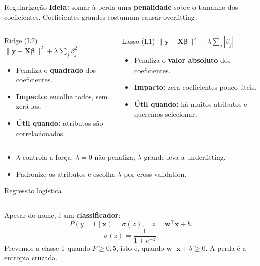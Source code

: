 \documentclass[10pt]{beamer}
\begin{document}
\begin{frame}{Regularização}
\small
\textbf{Ideia:} somar à perda uma \textbf{penalidade} sobre o tamanho dos coeficientes. Coeficientes grandes costumam causar overfitting.
\begin{columns}[T]
\begin{block}{Ridge (L2)}
$\|\mathbf{y}-\mathbf{X}\boldsymbol\beta\|^2+\lambda\sum_j\beta_j^2$
\begin{itemize}
 \item Penaliza o \textbf{quadrado} dos coeficientes.
 \item \textbf{Impacto:} encolhe todos, sem zerá-los.
 \item \textbf{Útil quando:} atributos são correlacionados.
\end{itemize}
\end{block}
\begin{block}{Lasso (L1)}
$\|\mathbf{y}-\mathbf{X}\boldsymbol\beta\|^2+\lambda\sum_j|\beta_j|$
\begin{itemize}
 \item Penaliza o \textbf{valor absoluto} dos coeficientes.
 \item \textbf{Impacto:} zera coeficientes pouco úteis.
 \item \textbf{Útil quando:} há muitos atributos e queremos selecionar.
\end{itemize}
\end{block}
\end{columns}
\begin{itemize}
 \item $\lambda$ controla a força: $\lambda=0$ não penaliza; $\lambda$ grande leva a underfitting.
 \item Padronize os atributos e escolha $\lambda$ por cross-validation.
\end{itemize}
\end{frame}

\begin{frame}{Regressão logística}
\begin{columns}[c]
Apesar do nome, é um \textbf{classificador}:
\[ P(y=1\mid\mathbf{x})=\sigma(z),\quad z=\mathbf{w}^\top\mathbf{x}+b. \]
\[ \sigma(z)=\frac{1}{1+e^{-z}}. \]
Prevemos a classe 1 quando $P\ge 0{,}5$, isto é, quando $\mathbf{w}^\top\mathbf{x}+b\ge0$. A perda é a entropia cruzada.
\end{columns}
\end{frame}
\end{document}
